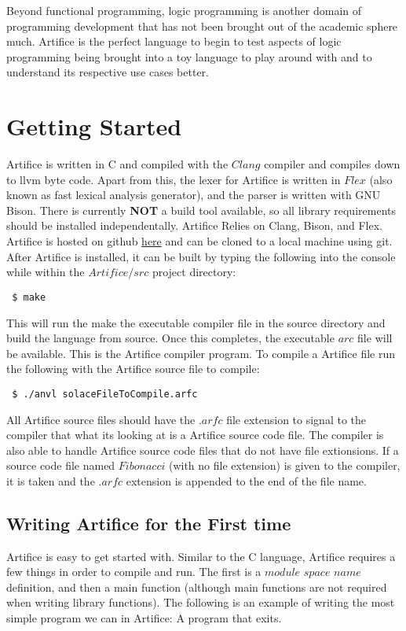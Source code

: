 \documentclass{article}
\begin{document}
Beyond functional programming, logic programming is another domain of programming development that has not been brought out
of the academic sphere much. Artifice is the perfect language to begin to test aspects of logic programming being brought into a
toy language to play around with and to understand its respective use cases better.


\section{Getting Started}
Artifice is written in C and compiled with the $Clang$ compiler and compiles down to llvm byte code. Apart from this, the lexer for Artifice is
written in $Flex$ (also known as fast lexical analysis generator), and the parser is written with GNU Bison. There is currently
\textbf{NOT} a  build tool available, so all library requirements should be installed independentally. Artifice Relies on Clang,
Bison, and Flex. Artifice is hosted on github \href{https://github.com/JustSomeCarbon/Artifice/tree/main}{here} and can be cloned
to a local machine using git. After Artifice is installed, it can be built by typing the following into the console while within the
$Artifice/src$ project directory:

\begin{lstlisting}
 $ make
\end{lstlisting}

This will run the make the executable compiler file in the source directory and build the language from source.
Once this completes, the executable $arc$ file will be available. This is the Artifice compiler program.
To compile a Artifice file run the following with the Artifice source file to compile:

\begin{lstlisting}
 $ ./anvl solaceFileToCompile.arfc
\end{lstlisting}

All Artifice source files should have the $.arfc$ file extension to signal to the compiler that what its looking at is a
Artifice source code file. The compiler is also able to handle Artifice source code files that do not have file extionsions.
If a source code file named $Fibonacci$ (with no file extension) is given to the compiler, it is taken and the $.arfc$ extension
is appended to the end of the file name.

\subsection{Writing Artifice for the First time}
Artifice is easy to get started with. Similar to the C language, Artifice requires a few things in order to compile
and run. The first is a $module$ $space$ $name$ definition, and then a main function (although main functions are not required when
writing library functions). The following is an example of writing the most simple program we can in Artifice: A program
that exits.
\end{document}
